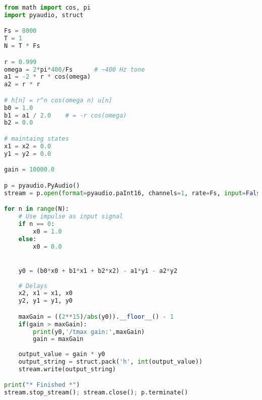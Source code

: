 \documentclass[11pt]{article}
\begin{document}
\begin{lstlisting}[language=python, breaklines=true]
from math import cos, pi
import pyaudio, struct

Fs = 8000
T = 1
N = T * Fs

r = 0.999
omega = 2*pi*400/Fs      # ~400 Hz tone
a1 = -2 * r * cos(omega)
a2 = r * r

# h[n] = r^n cos(omega n) u[n]
b0 = 1.0
b1 = a1 / 2.0    # = -r cos(omega)
b2 = 0.0

# maintaing states
x1 = x2 = 0.0
y1 = y2 = 0.0

gain = 10000.0

p = pyaudio.PyAudio()
stream = p.open(format=pyaudio.paInt16, channels=1, rate=Fs, input=False, output=True)

for n in range(N):
    # Use impulse as input signal
    if n == 0:
        x0 = 1.0
    else:
        x0 = 0.0


    y0 = (b0*x0 + b1*x1 + b2*x2) - a1*y1 - a2*y2
    
    # Delays
    x2, x1 = x1, x0
    y2, y1 = y1, y0

    maxGain = ((2**15)/abs(y0)).__floor__() - 1
    if(gain > maxGain):
        print(y0,'/tmax gain:',maxGain)
        gain = maxGain
        
    output_value = gain * y0
    output_string = struct.pack('h', int(output_value)) 
    stream.write(output_string)

print("* Finished *")
stream.stop_stream(); stream.close(); p.terminate()

\end{lstlisting}           

    
\end{document}
